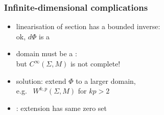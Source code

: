 \begin{frame}
  \frametitle{Infinite-dimensional complications}
  \begin{itemize}
    \item linearisation of section has a bounded inverse:\\ok, $d\Phi$ is a \pause

    \item domain must be a :\\
    but $C^\infty(\Sigma,M)$ is not complete!
    \item solution: extend $\Phi$ to a larger domain,\\
    e.g.\  $W^{k,p}(\Sigma,M)$ for $kp>2$
    \item {}: extension has same zero set
  \end{itemize}
\end{frame}

